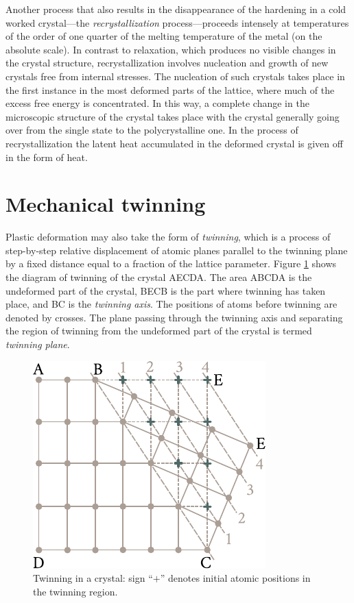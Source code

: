 Another process that also results in the disappearance of the hardening in a cold worked crystal---the \textit{recrystallization} process---proceeds intensely at temperatures of the order of one quarter of the melting temperature of the metal (on the absolute scale). In contrast to relaxation, which produces no visible changes in the crystal structure, recrystallization involves nucleation and growth of new crystals free from internal stresses. The nucleation of such crystals takes place in the first instance in the most deformed parts of the lattice, where much of the excess free energy is concentrated. In this way, a complete change in the microscopic structure of the crystal takes place with the crystal generally going over from the single state to the polycrystalline one. In the process of recrystallization the latent heat accumulated in the deformed crystal is given off in the form of heat.

\section{Mechanical twinning}\label{sec:15}

Plastic deformation may also take the form of \textit{twinning}, which is a process of step-by-step relative displacement of atomic planes parallel to the twinning plane by a fixed distance equal to a fraction of the lattice parameter. Figure \ref{fig:2_6} shows the diagram of twinning of the crystal AECDA. The area ABCDA is the undeformed part of the crystal, BECB is the part where twinning has taken place, and BC is the \textit{twinning axis}. The positions of atoms before twinning are denoted by crosses. The plane passing through the twinning axis and separating the region of twinning from the undeformed part of the crystal is termed \textit{twinning plane}.

\begin{figure}[t]
	\begin{center}
		\includegraphics[scale=1.0]{figures/ch_02/fig_2_6.pdf}
		\caption[]{Twinning in a crystal: sign ``$+$'' denotes initial atomic positions in the twinning region.}
		\label{fig:2_6}
	\end{center}
	\vspace{-0.7cm}
\end{figure}

